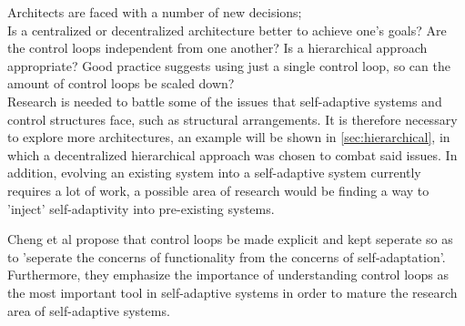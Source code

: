     
    \quad Architects are faced with a number of new decisions;\\
    Is a centralized or decentralized architecture better to achieve one's goals? Are the control loops independent from one another?
    Is a hierarchical approach appropriate? Good practice suggests using just a single control loop\cite{accidents}, so can the amount of control loops be scaled down?
    \\
    Research is needed to battle some of the issues that self-adaptive systems and control structures face, such as structural arrangements. 
    It is therefore necessary to explore more architectures, an example will be shown in \ref{sec:hierarchical}, in which a decentralized hierarchical approach was
    chosen to combat said issues. In addition, evolving an existing system into a self-adaptive system currently requires a lot of work, a possible area of research 
    would be finding a way to 'inject' self-adaptivity into pre-existing systems.
    
    \quad Cheng et al propose that control loops be made explicit and kept seperate so as to 'seperate the concerns of functionality from the concerns of self-adaptation'\cite[p. 16]{Cheng:2009:SES:1573856.1573858}.
    Furthermore, they emphasize the importance of understanding control loops as the most important tool in self-adaptive systems in order to mature the research area of self-adaptive systems.
    
